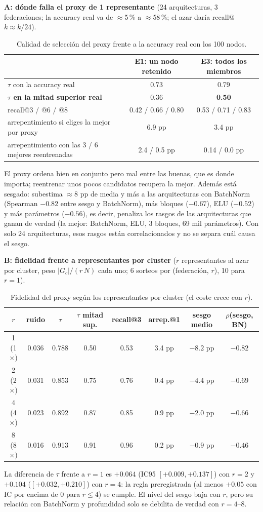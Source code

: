 \documentclass[11pt,a4paper]{article}
\begin{document}
\textbf{A: dónde falla el proxy de 1 representante} (24 arquitecturas, 3 federaciones; la accuracy real va de $\approx$5\,\% a $\approx$58\,\%; el azar daría recall@$k\approx k/24$).
\begin{table}[h]
\centering\small
\begin{tabular}{lcc}
\toprule
 & E1: un nodo retenido & E3: todos los miembros\\
\midrule
$\tau$ con la accuracy real & 0.73 & 0.79\\
\textbf{$\tau$ en la mitad superior real} & 0.36 & \textbf{0.50}\\
recall@3 / @6 / @8 & 0.42 / 0.66 / 0.80 & 0.53 / 0.71 / 0.83\\
arrepentimiento si eliges la mejor por proxy & 6.9 pp & 3.4 pp\\
arrepentimiento con las 3 / 6 mejores reentrenadas & 2.4 / 0.5 pp & 0.14 / 0.0 pp\\
\bottomrule
\end{tabular}
\caption{Calidad de selección del proxy frente a la accuracy real con los 100 nodos.}
\label{tab:A}
\end{table}
El proxy ordena bien en conjunto pero mal entre las buenas, que es donde importa; reentrenar unos pocos candidatos recupera la mejor. Además está sesgado: subestima $\approx$8 pp de media y más a las arquitecturas con BatchNorm (Spearman $-0.82$ entre sesgo y BatchNorm), más bloques ($-0.67$), ELU ($-0.52$) y más parámetros ($-0.56$), es decir, penaliza los rasgos de las arquitecturas que ganan de verdad (la mejor: BatchNorm, ELU, 3 bloques, 69 mil parámetros). Con solo 24 arquitecturas, esos rasgos están correlacionados y no se separa cuál causa el sesgo.

\textbf{B: fidelidad frente a representantes por cluster} ($r$ representantes al azar por cluster, peso $|G_c|/(r\,N)$ cada uno; 6 sorteos por (federación, $r$), 10 para $r=1$).
\begin{table}[h]
\centering\footnotesize
\setlength{\tabcolsep}{4pt}
\begin{tabular}{cccccccc}
\toprule
$r$ & ruido & $\tau$ & $\tau$ mitad sup. & recall@3 & arrep.@1 & sesgo medio & $\rho$(sesgo, BN)\\
\midrule
1 (1$\times$) & 0.036 & 0.788 & 0.50 & 0.53 & 3.4 pp & $-8.2$ pp & $-0.82$\\
2 (2$\times$) & 0.031 & 0.853 & 0.75 & 0.76 & 0.4 pp & $-4.4$ pp & $-0.69$\\
4 (4$\times$) & 0.023 & 0.892 & 0.87 & 0.85 & 0.9 pp & $-2.0$ pp & $-0.66$\\
8 (8$\times$) & 0.016 & 0.913 & 0.91 & 0.96 & 0.2 pp & $-0.9$ pp & $-0.46$\\
\bottomrule
\end{tabular}
\caption{Fidelidad del proxy según los representantes por cluster (el coste crece con $r$).}
\label{tab:B}
\end{table}
La diferencia de $\tau$ frente a $r=1$ es $+0.064$ (IC95 $[+0.009,+0.137]$) con $r=2$ y $+0.104$ ($[+0.032,+0.210]$) con $r=4$: la regla preregistrada (al menos $+0.05$ con IC por encima de 0 para $r\le4$) se cumple. El nivel del sesgo baja con $r$, pero su relación con BatchNorm y profundidad solo se debilita de verdad con $r=4$--8.
\end{document}

